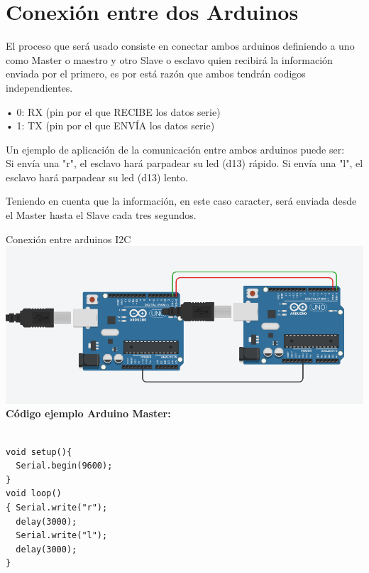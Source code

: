 \documentclass{article}
\begin{document}
\section{Conexión entre dos Arduinos}
\label{Comunicación entre dos Arduinos}
\begin{justify}
El proceso que será usado consiste en conectar ambos arduinos definiendo a uno como Master o maestro y otro Slave o esclavo quien recibirá la información enviada por el primero, es por está razón que ambos tendrán codigos independientes.\\
\end{justify}
\begin{justify}

•	0: RX (pin por el que RECIBE los datos serie)\\
•	1: TX (pin por el que ENVÍA los datos serie)\\ 

\end{justify}
\begin{justify}

Un ejemplo de aplicación de la comunicación entre ambos arduinos puede ser:\\
Si envía una "r", el esclavo hará parpadear su led (d13) rápido.
Si envía una "l", el esclavo hará parpadear su led (d13) lento.\\
\end{justify}

\begin{justify}
Teniendo en cuenta que la información, en este caso caracter, será enviada desde el Master hasta el Slave cada tres segundos.
\end{justify}
\newpage
\centering Conexión entre arduinos I2C\\

\includegraphics[scale=0.3]{figura4.png}\\

\textbf{Código ejemplo Arduino Master: }
\begin{verbatim}

void setup(){ 
  Serial.begin(9600);
}
void loop()
{ Serial.write("r");
  delay(3000);
  Serial.write("l");
  delay(3000);
}

\end{verbatim}
\end{document}
